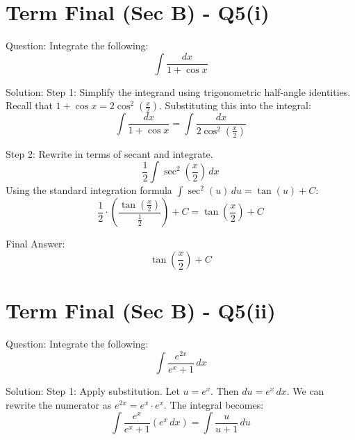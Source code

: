 \documentclass{article}
\begin{document}
\section*{Term Final (Sec B) - Q5(i)}
Question:
Integrate the following:
\[
\int \frac{dx}{1+\cos x}
\]

Solution:
Step 1: Simplify the integrand using trigonometric half-angle identities.
Recall that \(1 + \cos x = 2 \cos^2\left(\frac{x}{2}\right)\).
Substituting this into the integral:
\[
\int \frac{dx}{1+\cos x} = \int \frac{dx}{2 \cos^2\left(\frac{x}{2}\right)}
\]

Step 2: Rewrite in terms of secant and integrate.
\[
\frac{1}{2} \int \sec^2\left(\frac{x}{2}\right) \, dx
\]
Using the standard integration formula \(\int \sec^2(u) \, du = \tan(u) + C\):
\[
\frac{1}{2} \cdot \left( \frac{\tan\left(\frac{x}{2}\right)}{\frac{1}{2}} \right) + C = \tan\left(\frac{x}{2}\right) + C
\]

Final Answer:
\[
\boxed{\tan\left(\frac{x}{2}\right) + C}
\]

\section*{Term Final (Sec B) - Q5(ii)}
Question:
Integrate the following:
\[
\int \frac{e^{2x}}{e^x+1} \, dx
\]

Solution:
Step 1: Apply substitution.
Let \(u = e^x\). Then \(du = e^x \, dx\).
We can rewrite the numerator as \(e^{2x} = e^x \cdot e^x\).
The integral becomes:
\[
\int \frac{e^x}{e^x+1} (e^x \, dx) = \int \frac{u}{u+1} \, du
\]
\end{document}
